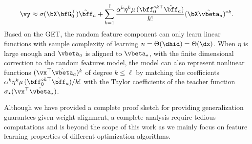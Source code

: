 \begin{align}
    \label{eq:train}
    \vy \approx \sigma(\bX\bfG_{0}^\top)\hat\bff_a  +  \sum_{k = 1}^{\ell} \frac{\alpha^k\eta^k \mu \,(\bff_0^{\circ k \top}\hat\bff_a)}{k!}(\bX\hat\vbeta_a)^{\circ k}.
\end{align}
Based on the GET, the random feature component can only learn linear functions with sample complexity of learning $n = \Theta(\dhid) = \Theta(\dx)$. When $\eta$ is large enough and $\vbeta_a$ is aligned to $\vbeta_\star$, with the finite dimensional correction to the random features model, the model can also represent nonlinear functions $(\vx^\top \hat\vbeta_a)^k$ of degree $k \leq \ell$ by matching the coefficients ${\alpha^k\eta^k \mu \,(\bff_0^{\circ k \top}\hat\bff_a)}/{k!}$ with the Taylor coefficients of the teacher function $\sigma_\star(\vx^\top \hat\vbeta_\star)$.

Although we have provided a complete proof sketch for providing generalization guarantees given weight alignment, a complete analysis require tedious computations and is beyond the scope of this work as we mainly focus on feature learning properties of different optimization algorithms.








